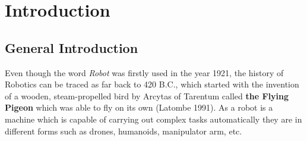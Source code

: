 \chapter{Introduction}
\section{General Introduction}
Even though the word \textit{Robot} was firstly used in the year 1921, the history of Robotics can be traced as far back to 420 B.C., which started with the invention of a wooden, steam-propelled bird by Arcytas of Tarentum called \textbf{the Flying Pigeon} which was able to fly on its own (Latombe 1991).
As a robot is a machine which is capable of carrying out complex tasks automatically they are in different forms such as drones, humanoids, manipulator arm, etc.

